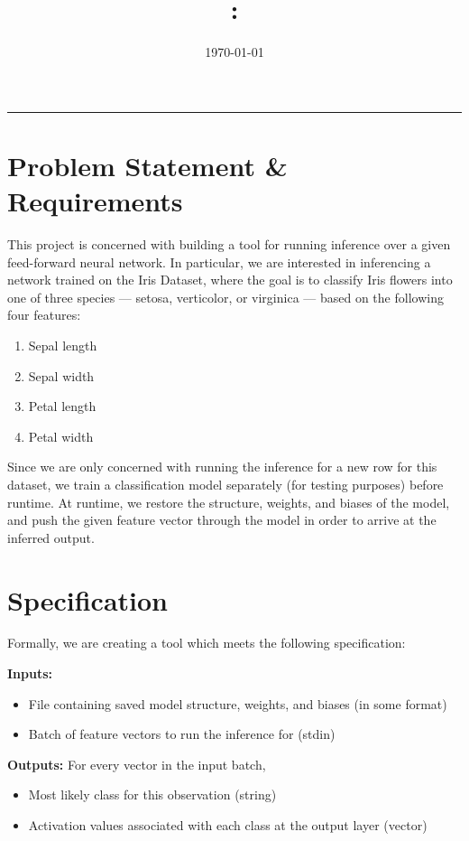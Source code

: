 \documentclass[12pt]{article}
\title{\code: \name}
\author{\me}
\date{\today}
\begin{document}
\maketitle
\hrule \bigskip

\section{Problem Statement \& Requirements}
This project is concerned with building a tool for running inference over a given feed-forward neural network. In particular, we are interested in inferencing a network trained on the Iris Dataset, where the goal is to classify Iris flowers into one of three species --- setosa, verticolor, or virginica --- based on the following four features:
\begin{enumerate}
	\item Sepal length
	\item Sepal width
	\item Petal length
	\item Petal width
\end{enumerate}

Since we are only concerned with running the inference for a new row for this dataset, we train a classification model separately (for testing purposes) before runtime. At runtime, we restore the structure, weights, and biases of the model, and push the given feature vector through the model in order to arrive at the inferred output.

\section{Specification}
Formally, we are creating a tool which meets the following specification:\bigskip

\textbf{Inputs:} 
\begin{itemize}
	\item File containing saved model structure, weights, and biases (in some format)
	\item Batch of feature vectors to run the inference for (stdin)
\end{itemize}

\textbf{Outputs:}
For every vector in the input batch,
\begin{itemize}
	\item Most likely class for this observation (string)
	\item Activation values associated with each class at the output layer (vector)
\end{itemize}
\end{document}
